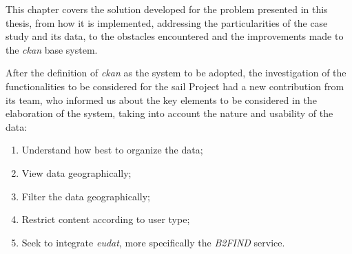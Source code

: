 \label{ref:chapter_3}

This chapter covers the solution developed for the problem presented in this thesis, from how it is implemented, addressing the particularities of the case study and its data, to the obstacles encountered and the improvements made to the \textit{\gls{ckan}} base system.

After the definition of \textit{\gls{ckan}} as the system to be adopted, the investigation of the functionalities to be considered for the \gls{sail} Project had a new contribution from its team, who informed us about the key elements to be considered in the elaboration of the system, taking into account the nature and usability of the data:
  
  \begin{enumerate}
      \item Understand how best to organize the data;
      \item View data geographically;
      \item Filter the data geographically;
      \item Restrict content according to user type;
      \item Seek to integrate \textit{\gls{eudat}}, more specifically the \textit{B2FIND} service.
  \end{enumerate}
